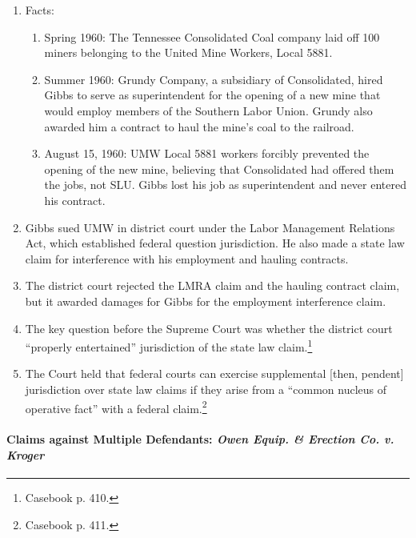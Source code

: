 \begin{enumerate}
    \item Facts:
    \begin{enumerate}
        \item Spring 1960: The Tennessee Consolidated Coal company laid off 
        100 miners belonging to the United Mine Workers, Local 5881.
        \item Summer 1960: Grundy Company, a subsidiary of Consolidated, hired 
        Gibbs to serve as superintendent for the opening of a new mine that 
        would employ members of the Southern Labor Union. Grundy also awarded 
        him a contract to haul the mine's coal to the railroad.
        \item August 15, 1960: UMW Local 5881 workers forcibly prevented the 
        opening of the new mine, believing that Consolidated had offered them 
        the jobs, not SLU. Gibbs lost his job as superintendent and never 
        entered his contract.
    \end{enumerate}
    \item Gibbs sued UMW in district court under the Labor Management 
    Relations Act, which established federal question jurisdiction. He also 
    made a state law claim for interference with his employment and hauling 
    contracts.
    \item The district court rejected the LMRA claim and the hauling contract 
    claim, but it awarded damages for Gibbs for the employment interference 
    claim.
    \item The key question before the Supreme Court was whether the district 
    court ``properly entertained'' jurisdiction of the state law 
    claim.\footnote{Casebook p. 410.}
    \item The Court held that federal courts can exercise supplemental [then, 
    pendent] jurisdiction over state law claims if they arise from a ``common 
    nucleus of operative fact'' with a federal claim.\footnote{Casebook p.  
    411.}
\end{enumerate}

\paragraph{Claims against Multiple Defendants: \emph{Owen Equip. \& Erection 
Co.  v. Kroger}}

